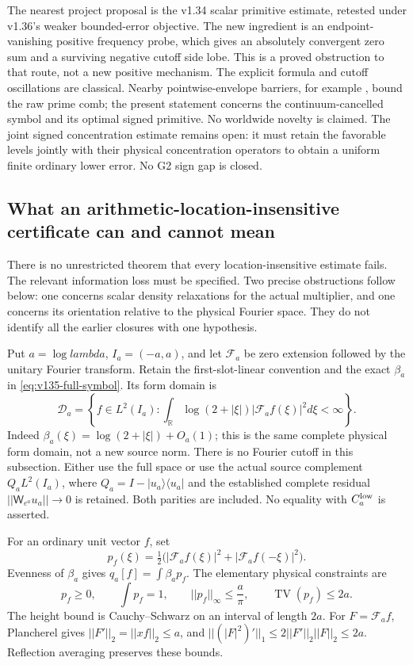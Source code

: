 \documentclass[11pt]{article}
\def\lambda{lambda}%
\def\norm#1{||#1||}%
\theoremstyle{remark}
\newcommand{\norm}[1]{\left\lVert #1\right\rVert}
\begin{document}
The nearest project proposal is the v1.34 scalar primitive estimate,
retested under v1.36's weaker bounded-error objective. The new ingredient
is an endpoint-vanishing positive frequency probe, which gives an
absolutely convergent zero sum and a surviving negative cutoff side lobe.
This is a proved obstruction to that route, not a new positive mechanism.
The explicit formula and cutoff oscillations are classical. Nearby
pointwise-envelope barriers, for example \cite{Zhu2026}, bound the raw
prime comb; the present statement concerns the continuum-cancelled
symbol and its optimal signed primitive. No worldwide novelty is claimed.
The joint signed concentration estimate remains open: it must retain
the favorable levels jointly with their physical concentration operators
to obtain a uniform finite ordinary lower error. No G2 sign gap is closed.


\subsection{What an arithmetic-location-insensitive certificate can and cannot mean}

There is no unrestricted theorem that every location-insensitive estimate
fails. The relevant information loss must be specified. Two precise
obstructions follow below: one concerns scalar density relaxations for
the actual multiplier, and one concerns its orientation relative to the
physical Fourier space. They do not identify all the earlier closures
with one hypothesis.

Put $a=\log\lambda$, $I_a=(-a,a)$, and let $\mathcal F_a$ be zero
extension followed by the unitary Fourier transform. Retain the
first-slot-linear convention and the exact $\beta_a$ in
\eqref{eq:v135-full-symbol}. Its form domain is
\[
 \mathcal D_a=\left\{f\in L^2(I_a):
 \int_{\mathbb R}\log(2+|\xi|)|\mathcal F_af(\xi)|^2d\xi<\infty\right\}.
\]
Indeed $\beta_a(\xi)=\log(2+|\xi|)+O_a(1)$; this is the same
complete physical form domain, not a new source norm. There is no
Fourier cutoff in this subsection. Either use the full space or use
the actual source complement $Q_aL^2(I_a)$, where
$Q_a=I-|u_a\rangle\langle u_a|$ and the established complete
residual $\norm{\mathsf W_{e^a}u_a}\to0$ is retained. Both parities
are included. No equality with $C_a^{\rm low}$ is asserted.

For an ordinary unit vector $f$, set
\[
 p_f(\xi)=\tfrac12\bigl(|\mathcal F_af(\xi)|^2+
                               |\mathcal F_af(-\xi)|^2\bigr).
\]
Evenness of $\beta_a$ gives $q_a[f]=\int\beta_ap_f$. The elementary
physical constraints are
\begin{equation}\label{eq:v139-density-constraints}
 p_f\ge0,\qquad \int p_f=1,\qquad
 \norm{p_f}_\infty\le\frac a\pi,\qquad
 \operatorname{TV}(p_f)\le2a.
\end{equation}
The height bound is Cauchy--Schwarz on an interval of length $2a$.
For $F=\mathcal F_af$, Plancherel gives
$\norm{F'}_2=\norm{xf}_2\le a$, and
$\norm{(|F|^2)'}_1\le2\norm{F'}_2\norm F_2\le2a$.
Reflection averaging preserves these bounds.
\end{document}
